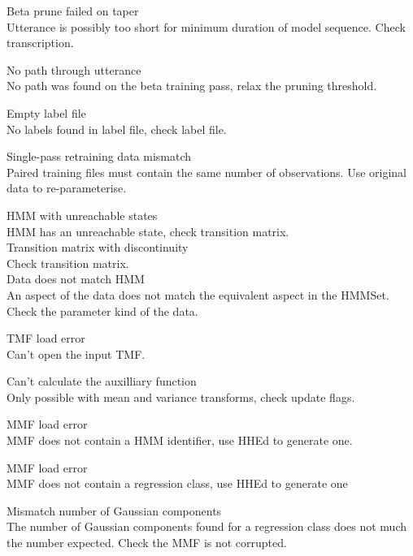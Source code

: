\begin{itemize}
\begin{itemize}
    Beta prune failed on taper\\
        Utterance is possibly too short for minimum duration
        of model sequence. Check transcription.

    No path through utterance\\
        No path was found on the beta training pass, relax the
        pruning threshold.

    Empty label file\\
        No labels found in label file, check label file.

    Single-pass retraining data mismatch\\
        Paired training files must contain the same number of observations.  
        Use original data to re-parameterise.

  HMM with unreachable states\\
        HMM has an unreachable state, check transition matrix.\\

 Transition matrix with discontinuity\\
        Check transition matrix.\\        

    Data does not match HMM\\
        An aspect of the data does not match the equivalent aspect in 
        the HMMSet.  Check the parameter kind of the data.

\end{itemize}


\begin{itemize}

 TMF load error\\
        Can't open the input TMF.

 Can't calculate the auxilliary function\\
        Only possible with mean and variance transforms, check update flags.

 MMF load error\\
        MMF does not contain a HMM identifier, use HHEd to generate
        one.

 MMF load error\\
        MMF does not contain a regression class, use HHEd to generate
        one
  
 Mismatch number of Gaussian components \\
        The number of Gaussian components found for a regression class
        does not much the number expected. Check the MMF is not corrupted.


\end{itemize}
\end{itemize}
